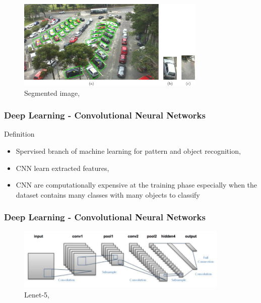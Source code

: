 \documentclass{beamer}
\begin{document}
\begin{frame}[allowframebreaks]
\begin{itemize}
		\begin{figure}[h!]
		\centering
		\includegraphics[width=0.8\textwidth]{Pictures/parking}
		\caption{Segmented image, \cite{deAlmeida}}
	\end{figure}
	
\end{itemize}

\end{frame}

\begin{frame}
\frametitle{Deep Learning - Convolutional Neural Networks }

\begin{block}{Definition}

\begin{itemize}
\item Spervised branch of machine learning for pattern and object recognition,
\item CNN learn extracted features,
\item CNN are computationally expensive at the training phase especially when the dataset contains many classes with many objects to classify
\end{itemize}

\end{block}
\end{frame}

\begin{frame}
\frametitle{Deep Learning - Convolutional Neural Networks }

\begin{figure}[h!]
    \centering
    \includegraphics[width=0.9\textwidth]{Pictures/lenet_architecture}
    \caption{Lenet-5, \cite{Lecun98gradient-basedlearning}}
\end{figure}

\end{frame}
\end{document}
